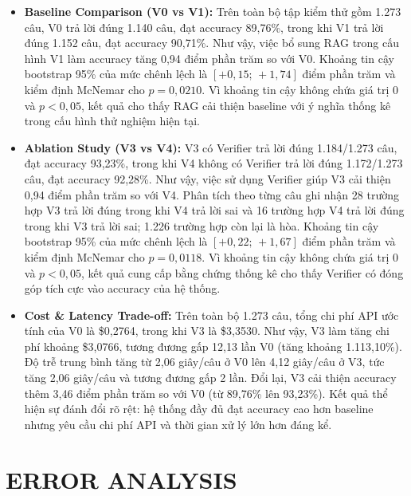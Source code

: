 \begin{itemize}
    \item \textbf{Baseline Comparison (V0 vs V1):}
    Trên toàn bộ tập kiểm thử gồm 1.273 câu, V0 trả lời đúng
    1.140 câu, đạt accuracy 89,76\%, trong khi V1 trả lời đúng
    1.152 câu, đạt accuracy 90,71\%. Như vậy, việc bổ sung RAG
    trong cấu hình V1 làm accuracy tăng 0,94 điểm phần trăm so
    với V0. Khoảng tin cậy bootstrap 95\% của mức chênh lệch là
    $[+0{,}15;\,+1{,}74]$ điểm phần trăm và kiểm định McNemar cho
    $p=0{,}0210$. Vì khoảng tin cậy không chứa giá trị 0 và
    $p<0{,}05$, kết quả cho thấy RAG cải thiện baseline với ý
    nghĩa thống kê trong cấu hình thử nghiệm hiện tại.

    \item \textbf{Ablation Study (V3 vs V4):}
    V3 có Verifier trả lời đúng 1.184/1.273 câu, đạt accuracy
    93,23\%, trong khi V4 không có Verifier trả lời đúng
    1.172/1.273 câu, đạt accuracy 92,28\%. Như vậy, việc sử dụng
    Verifier giúp V3 cải thiện 0,94 điểm phần trăm so với V4.
    Phân tích theo từng câu ghi nhận 28 trường hợp V3 trả lời đúng
    trong khi V4 trả lời sai và 16 trường hợp V4 trả lời đúng trong
    khi V3 trả lời sai; 1.226 trường hợp còn lại là hòa. Khoảng tin
    cậy bootstrap 95\% của mức chênh lệch là
    $[+0{,}22;\,+1{,}67]$ điểm phần trăm và kiểm định McNemar cho
    $p=0{,}0118$. Vì khoảng tin cậy không chứa giá trị 0 và
    $p<0{,}05$, kết quả cung cấp bằng chứng thống kê cho thấy
    Verifier có đóng góp tích cực vào accuracy của hệ thống.

    \item \textbf{Cost \& Latency Trade-off:}
    Trên toàn bộ 1.273 câu, tổng chi phí API ước tính của V0 là
    \$0,2764, trong khi V3 là \$3,3530. Như vậy, V3 làm tăng chi
    phí khoảng \$3,0766, tương đương gấp 12,13 lần V0
    (tăng khoảng 1.113,10\%). Độ trễ trung bình tăng từ
    2,06 giây/câu ở V0 lên 4,12 giây/câu ở V3, tức tăng
    2,06 giây/câu và tương đương gấp 2 lần. Đổi lại, V3 cải thiện
    accuracy thêm 3,46 điểm phần trăm so với V0
    (từ 89,76\% lên 93,23\%). Kết quả thể hiện sự đánh đổi rõ rệt:
    hệ thống đầy đủ đạt accuracy cao hơn baseline nhưng yêu cầu
    chi phí API và thời gian xử lý lớn hơn đáng kể.
\end{itemize}
\section{ERROR ANALYSIS}

